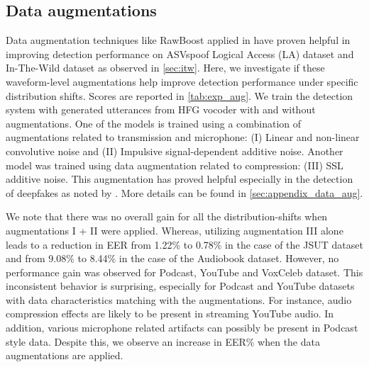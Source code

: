 \subsection{Data augmentations} \label{sec:augmentation}
Data augmentation techniques like RawBoost \cite{tak2022rawboostrawdataboosting} applied in \cite{tak2022automaticspeakerverificationspoofing} have proven helpful in improving detection performance on ASVspoof Logical Access (LA) dataset and In-The-Wild dataset as observed in \autoref{sec:itw}. Here, we investigate if these waveform-level augmentations help improve detection performance under specific distribution shifts. Scores are reported in \autoref{tab:exp_aug}. We train the detection system with generated utterances from HFG vocoder with and without augmentations. One of the models is trained using a combination of augmentations related to transmission and microphone: (I) Linear and non-linear convolutive noise and (II) Impulsive signal-dependent additive noise. Another model was trained using data augmentation related to compression: (III) SSL additive noise. This augmentation has proved helpful especially in the detection of deepfakes as noted by \cite{tak2022automaticspeakerverificationspoofing}. More details can be found in \autoref{sec:appendix_data_aug}.

We note that there was no overall gain for all the distribution-shifts when augmentations I + II were applied. Whereas, utilizing augmentation III alone leads to a reduction in EER from 1.22\% to 0.78\% in the case of the JSUT dataset and from 9.08\% to 8.44\% in the case of the Audiobook dataset. However, no performance gain was observed for Podcast, YouTube and VoxCeleb dataset. This inconsistent behavior is surprising, especially for Podcast and YouTube datasets with data characteristics matching with the augmentations. For instance, audio compression effects are likely to be present in streaming YouTube audio. In addition, various microphone related artifacts can possibly be present in Podcast style data. Despite this, we observe an increase in EER\% when the data augmentations are applied.


